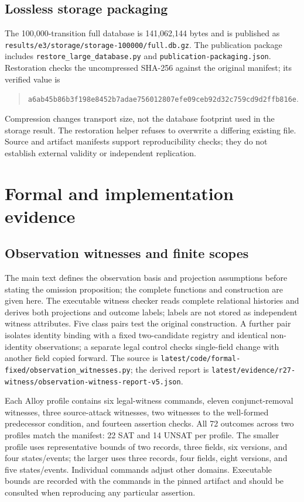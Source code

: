 \documentclass[11pt,a4paper]{article}
\newcommand{\code}[1]{\nolinkurl{#1}}
\begin{document}
\subsection{Lossless storage packaging}

The 100,000-transition full database is 141,062,144 bytes and is published as \code{results/e3/storage/storage-100000/full.db.gz}. The publication package includes \code{restore_large_database.py} and \code{publication-packaging.json}. Restoration checks the uncompressed SHA-256 against the original manifest; its verified value is
\begin{quote}\small
\code{a6ab45b86b3f198e8452b7adae756012807efe09ceb92d32c759cd9d2ffb816e}.
\end{quote}
Compression changes transport size, not the database footprint used in the storage result. The restoration helper refuses to overwrite a differing existing file. Source and artifact manifests support reproducibility checks; they do not establish external validity or independent replication.

\section{Formal and implementation evidence}
\label{app:formal-details}



\subsection{Observation witnesses and finite scopes}

The main text defines the observation basis and projection assumptions before stating the omission proposition; the complete functions and construction are given here. The executable witness checker reads complete relational histories and derives both projections and outcome labels; labels are not stored as independent witness attributes. Five class pairs test the original construction. A further pair isolates identity binding with a fixed two-candidate registry and identical non-identity observations; a separate legal control checks single-field change with another field copied forward. The source is \code{latest/code/formal-fixed/observation_witnesses.py}; the derived report is \code{latest/evidence/r27-witness/observation-witness-report-v5.json}.

Each Alloy profile contains six legal-witness commands, eleven conjunct-removal witnesses, three source-attack witnesses, two witnesses to the well-formed predecessor condition, and fourteen assertion checks. All 72 outcomes across two profiles match the manifest: 22 SAT and 14 UNSAT per profile. The smaller profile uses representative bounds of two records, three fields, six versions, and four states/events; the larger uses three records, four fields, eight versions, and five states/events. Individual commands adjust other domains. Executable bounds are recorded with the commands in the pinned artifact and should be consulted when reproducing any particular assertion.
\end{document}
